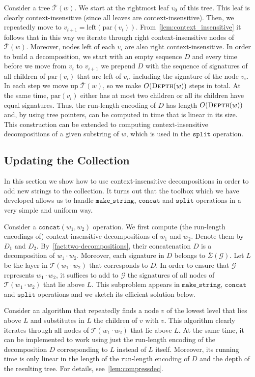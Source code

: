 \documentclass[a4paper]{article}
\theoremstyle{remark}
\newcommand{\makeop}{\mathtt{make\_string}}
\newcommand{\concop}{\mathtt{concat}}
\newcommand{\splitop}{\mathtt{split}}
\newcommand{\sigs}{\bar{\Sigma}}
\newcommand{\depth}{\textsc{Depth}}
\newcommand{\str}{w}
\newcommand{\grammar}{\mathcal{G}}
\newcommand{\stree}{\mathcal{T}}
\newcommand{\ustree}{\mathcal{\overline{T}}}
\newcommand{\uspar}{\mathrm{par}}
\newcommand{\usleft}{\mathrm{left}}
\begin{document}
Consider a tree $\ustree(\str)$.
We start at the rightmost leaf $v_0$ of this tree.
This leaf is clearly context-insensitive (since all leaves are context-insensitive).
Then, we repeatedly move to $v_{i+1}=\usleft(\uspar(v_{i}))$.
From~\cref{lem:context_insensitive} it follows that in this way we iterate through right context-insensitive nodes of $\ustree(\str)$.
Moreover, nodes left of each $v_i$ are also right context-insensitive.
In order to build a decomposition, we start with an empty sequence $D$ and every time before we move from $v_{i}$ to $v_{i+1}$ we prepend $D$ with the sequence of signatures of all children of $\uspar(v_i)$ that are left of $v_i$, including the signature of the node $v_i$.
In each step we move up $\ustree(\str)$, so we make $O(\depth(\str))$ steps in total.
At the same time, $\uspar(v_i)$ either has at most two children or all its children have equal signatures.
Thus, the run-length encoding of $D$ has length $O(\depth(\str))$ and, by using tree pointers, can be computed in time that is linear in its size.
This construction can be extended to computing context-insensitive decompositions of a given substring of $\str$, which is used in the $\splitop$ operation.

\subsection{Updating the Collection}
In this section we show how to use context-insensitive decompositions in order to add new strings to the collection.
It turns out that the toolbox which we have developed allows us to handle $\makeop$, $\concop$ and $\splitop$ operations in a very simple and uniform way.

Consider a $\concop(\str_1, \str_2)$ operation.
We first compute (the run-length encodings of) context-insensitive decompositions of $\str_1$ and $\str_2$.
Denote them by $D_1$ and $D_2$.
By~\cref{fact:two-decompositions}, their concatenation $D$ is a decomposition of $\str_1 \cdot \str_2$.
Moreover, each signature in $D$ belongs to $\sigs(\grammar)$.
Let $L$ be the layer in $\stree(\str_1 \cdot \str_2)$ that corresponds to $D$.
In order to ensure that $\grammar$ represents $\str_1 \cdot \str_2$, it suffices to add to $\grammar$ the signatures of all nodes of $\stree(\str_1 \cdot \str_2)$ that lie above $L$.
This subproblem appears in $\makeop$, $\concop$ and $\splitop$ operations and we sketch its efficient solution below.

Consider an algorithm that repeatedly finds a node $v$ of the lowest level that lies above $L$ and substitutes in $L$ the children of $v$ with $v$.
This algorithm clearly iterates through all nodes of $\stree(\str_1 \cdot \str_2)$ that lie above $L$.
At the same time, it can be implemented to work using just the run-length encoding of the decomposition $D$ corresponding to $L$ instead of $L$ itself.
Moreover, its running time is only linear in the length of the run-length encoding of $D$ and the depth of the resulting tree. 
For details, see~\cref{lem:compressdec}.
\end{document}
